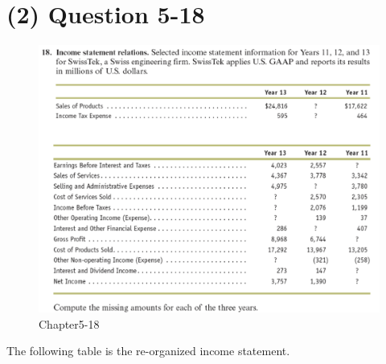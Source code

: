 \documentclass[
  letterpaper,
  DIV=11,
  numbers=noendperiod]{scrreprt}
\begin{document}
\section*{(2) Question 5-18}\label{question-5-18}


\begin{figure}[H]

{\centering \includegraphics{images/재무회계_5-18.png}

}

\caption{Chapter5-18}

\end{figure}%

The following table is the re-organized income statement.
\end{document}
